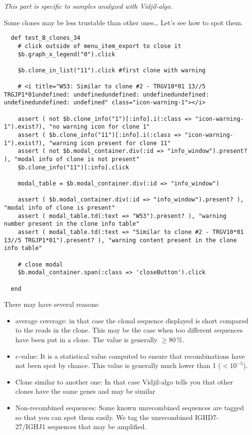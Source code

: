 \bigskip

\textit{This part is specific to samples analyzed with Vidjil-algo.}

Some clones may be less trustable than other ones\dots{} Let's see how to spot them.
\begin{verbatim}
  def test_B_clones_34
    # click outside of menu_item_export to close it
    $b.graph_x_legend("0").click

    $b.clone_in_list("11").click #first clone with warning

    # <i title="W53: Similar to clone #2 - TRGV10*01 13//5 TRGJP1*01undefined: undefinedundefined: undefinedundefined: undefinedundefined: undefined" class="icon-warning-1"></i>

    assert ( not $b.clone_info("1")[:info].i(:class => "icon-warning-1").exist?), "no warning icon for clone 1"
    assert ( $b.clone_info("11")[:info].i(:class => "icon-warning-1").exist?), "warning icon present for clone 11"
    assert ( not $b.modal_container.div(:id => "info_window").present? ), "modal info of clone is not present"
    $b.clone_info("11")[:info].click

    modal_table = $b.modal_container.div(:id => "info_window")
    
    assert ( $b.modal_container.div(:id => "info_window").present? ), "modal info of clone is present"
    assert ( modal_table.td(:text => "W53").present? ), "warning number present in the clone info table"
    assert ( modal_table.td(:text => "Similar to clone #2 - TRGV10*01 13//5 TRGJP1*01").present? ), "warning content present in the clone info table"

    # close modal
    $b.modal_container.span(:class => 'closeButton').click

  end
\end{verbatim}

There may have several reasons: 
\begin{itemize}
\item average coverage: in that case the clonal sequence displayed is short
  compared to the reads in the clone. This may be the case when too different
  sequences have been put in a clone. The value is generally $\geq 80\,\%$.
\item $e$-value: It is a statistical value computed to ensure that
  recombinations have not been spot by chance. This value is generally much
  lower than 1 ($<10^{-5}$).
\item Clone similar to another one: In that case Vidjil-algo tells you that
  other clones have the same genes and may be similar
\item Non-recombined sequences: Some known unrecombined sequences are tagged
  so that you can spot them easily. We tag the unrecombined IGHD7-27/IGHJ1
  sequences that may be amplified.
\end{itemize}

